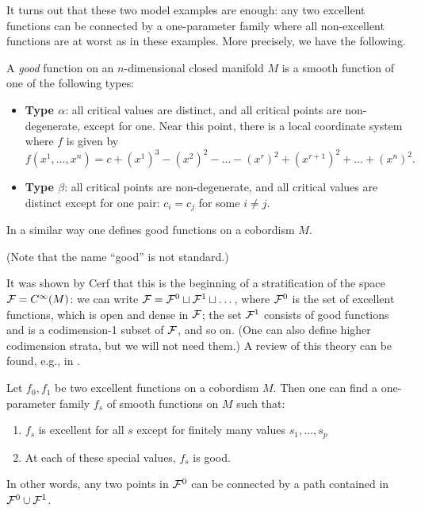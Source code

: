 It turns out that these two model examples are enough: any two excellent
functions can be connected by a one-parameter family where all non-excellent
functions are at worst as in these examples. More precisely, we have the
following.

\begin{definition}\label{d:morse-good}
  A \emph{good} function on an $n$-dimensional closed manifold $M$ is a
  smooth function of one of the following types:
  \begin{itemize}
    \item {\bf Type $\alpha$}: all critical values are distinct, and all
      critical points are non-degenerate, except for one. Near this point,
      there is a local coordinate system where $f$ is given by
      $$
      f(x^1, \dots, x^n)=c+(x^1)^3 -(x^2)^2-\dots -(x^r)^2+(x^{r+1})^2 +
                        \dots +(x^n)^2.
      $$
    \item {\bf Type $\beta$}: all critical points are non-degenerate, and
      all critical values are distinct except for one pair: $c_i = c_j$
      for some $i\ne j$.
  \end{itemize}
  In a similar way one defines good functions on a cobordism $M$.
\end{definition}

(Note that the name ``good'' is not standard.)

It was shown by Cerf that this is the beginning of a stratification of the
space $\mathcal{F}=C^\infty(M)$: we can write
$\mathcal{F} = \mathcal{F}^0\sqcup \mathcal{F}^1\sqcup\dots$,
where $\mathcal{F}^0$ is the set of excellent functions, which is open and dense in
$\mathcal{F}$; the set $\mathcal{F}^1$ consists of good functions and is a codimension-1
subset of $\mathcal{F}$, and so on. (One can also define higher codimension strata,
but we will not need them.) A review of this theory can be found, e.g., in
\cite[Section I.2]{hatcher-wagoner}.

\begin{theorem}\label{t:cerf1}
  Let $f_0, f_1$ be two excellent functions on a cobordism $M$. Then one can
  find a one-parameter family $f_s$ of smooth functions on $M$ such that:
  \begin{enumerate}
    \item $f_s$ is excellent for all $s$ except for finitely
      many values $s_1, \dots, s_p$
    \item At each of these special values, $f_s$ is good.
  \end{enumerate}
\end{theorem}
In other words, any two points in $\mathcal{F}^0$ can be connected by a path
contained in $\mathcal{F}^0\cup \mathcal{F}^1$.

